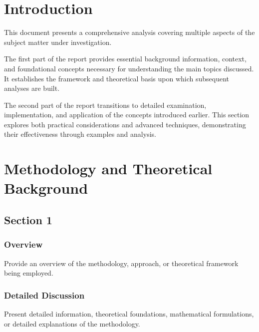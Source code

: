 
\newpage
{}
\doublespacing
\thispagestyle{fancy}



\section{Introduction}

This document presents a comprehensive analysis covering multiple aspects of the subject matter under investigation.

The first part of the report provides essential background information, context, and foundational concepts necessary for understanding the main topics discussed. It establishes the framework and theoretical basis upon which subsequent analyses are built.

The second part of the report transitions to detailed examination, implementation, and application of the concepts introduced earlier. This section explores both practical considerations and advanced techniques, demonstrating their effectiveness through examples and analysis.

\section{Methodology and Theoretical Background}

\subsection{Section 1}
\subsubsection{Overview}
Provide an overview of the methodology, approach, or theoretical framework being employed.

\subsubsection{Detailed Discussion}
Present detailed information, theoretical foundations, mathematical formulations, or detailed explanations of the methodology.

